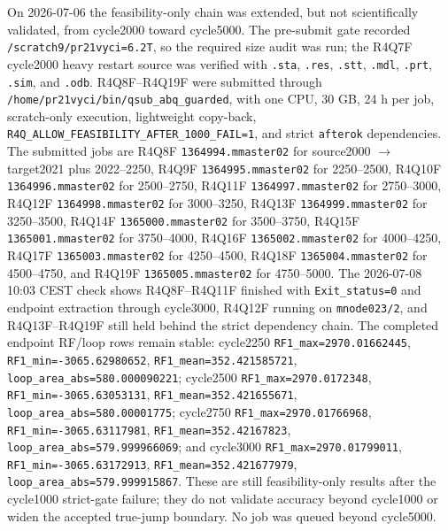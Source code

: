 \documentclass[11pt,a4paper]{article}
\newcommand{\code}[1]{\texttt{#1}}
\begin{document}
On 2026-07-06 the feasibility-only chain was extended, but not scientifically validated, from cycle2000 toward cycle5000. The pre-submit gate recorded \code{/scratch9/pr21vyci=6.2T}, so the required size audit was run; the R4Q7F cycle2000 heavy restart source was verified with \code{.sta}, \code{.res}, \code{.stt}, \code{.mdl}, \code{.prt}, \code{.sim}, and \code{.odb}. R4Q8F--R4Q19F were submitted through \code{/home/pr21vyci/bin/qsub\_abq\_guarded}, with one CPU, 30 GB, 24 h per job, scratch-only execution, lightweight copy-back, \code{R4Q\_ALLOW\_FEASIBILITY\_AFTER\_1000\_FAIL=1}, and strict \code{afterok} dependencies. The submitted jobs are R4Q8F \code{1364994.mmaster02} for source2000 \(\rightarrow\) target2021 plus 2022--2250, R4Q9F \code{1364995.mmaster02} for 2250--2500, R4Q10F \code{1364996.mmaster02} for 2500--2750, R4Q11F \code{1364997.mmaster02} for 2750--3000, R4Q12F \code{1364998.mmaster02} for 3000--3250, R4Q13F \code{1364999.mmaster02} for 3250--3500, R4Q14F \code{1365000.mmaster02} for 3500--3750, R4Q15F \code{1365001.mmaster02} for 3750--4000, R4Q16F \code{1365002.mmaster02} for 4000--4250, R4Q17F \code{1365003.mmaster02} for 4250--4500, R4Q18F \code{1365004.mmaster02} for 4500--4750, and R4Q19F \code{1365005.mmaster02} for 4750--5000. The 2026-07-08 10:03 CEST check shows R4Q8F--R4Q11F finished with \code{Exit\_status=0} and endpoint extraction through cycle3000, R4Q12F running on \code{mnode023/2}, and R4Q13F--R4Q19F still held behind the strict dependency chain. The completed endpoint RF/loop rows remain stable: cycle2250 \code{RF1\_max=2970.01662445}, \code{RF1\_min=-3065.62980652}, \code{RF1\_mean=352.421585721}, \code{loop\_area\_abs=580.000090221}; cycle2500 \code{RF1\_max=2970.0172348}, \code{RF1\_min=-3065.63053131}, \code{RF1\_mean=352.421655671}, \code{loop\_area\_abs=580.00001775}; cycle2750 \code{RF1\_max=2970.01766968}, \code{RF1\_min=-3065.63117981}, \code{RF1\_mean=352.42167823}, \code{loop\_area\_abs=579.999966069}; and cycle3000 \code{RF1\_max=2970.01799011}, \code{RF1\_min=-3065.63172913}, \code{RF1\_mean=352.421677979}, \code{loop\_area\_abs=579.999915867}. These are still feasibility-only results after the cycle1000 strict-gate failure; they do not validate accuracy beyond cycle1000 or widen the accepted true-jump boundary. No job was queued beyond cycle5000.
\end{document}
